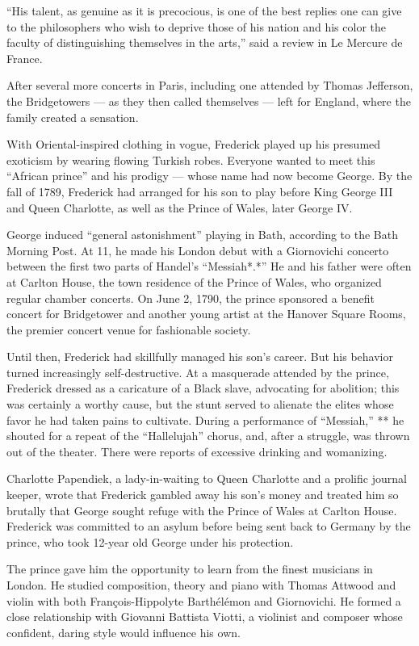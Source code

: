 ``His talent, as genuine as it is precocious, is one of the best replies
one can give to the philosophers who wish to deprive those of his nation
and his color the faculty of distinguishing themselves in the arts,''
said a review in Le Mercure de France.

After several more concerts in Paris, including one attended by Thomas
Jefferson, the Bridgetowers --- as they then called themselves --- left
for England, where the family created a sensation.

With Oriental-inspired clothing in vogue, Frederick played up his
presumed exoticism by wearing flowing Turkish robes. Everyone wanted to
meet this ``African prince'' and his prodigy --- whose name had now
become George. By the fall of 1789, Frederick had arranged for his son
to play before King George III and Queen Charlotte, as well as the
Prince of Wales, later George IV.

George induced ``general astonishment'' playing in Bath, according to
the Bath Morning Post. At 11, he made his London debut with a
Giornovichi concerto between the first two parts of Handel's
``Messiah*.*'' He and his father were often at Carlton House, the town
residence of the Prince of Wales, who organized regular chamber
concerts. On June 2, 1790, the prince sponsored a benefit concert for
Bridgetower and another young artist at the Hanover Square Rooms, the
premier concert venue for fashionable society.

Until then, Frederick had skillfully managed his son's career. But his
behavior turned increasingly self-destructive. At a masquerade attended
by the prince, Frederick dressed as a caricature of a Black slave,
advocating for abolition; this was certainly a worthy cause, but the
stunt served to alienate the elites whose favor he had taken pains to
cultivate. During a performance of ``Messiah,'' ** he shouted for a
repeat of the ``Hallelujah'' chorus, and, after a struggle, was thrown
out of the theater. There were reports of excessive drinking and
womanizing.

Charlotte Papendiek, a lady-in-waiting to Queen Charlotte and a prolific
journal keeper, wrote that Frederick gambled away his son's money and
treated him so brutally that George sought refuge with the Prince of
Wales at Carlton House. Frederick was committed to an asylum before
being sent back to Germany by the prince, who took 12-year old George
under his protection.

The prince gave him the opportunity to learn from the finest musicians
in London. He studied composition, theory and piano with Thomas Attwood
and violin with both François-Hippolyte Barthélémon and Giornovichi. He
formed a close relationship with Giovanni Battista Viotti, a violinist
and composer whose confident, daring style would influence his own.

